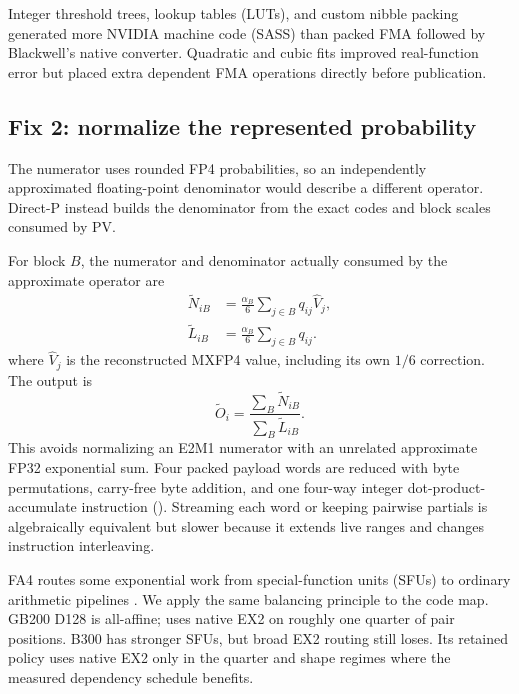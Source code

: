 Integer threshold trees, lookup tables (LUTs), and custom nibble packing
generated more NVIDIA machine code (SASS) than packed FMA followed by
Blackwell's native converter. Quadratic and cubic
fits improved real-function error but placed extra dependent FMA operations
directly before publication.

\subsection{Fix 2: normalize the represented probability}

The numerator uses rounded FP4 probabilities, so an independently approximated
floating-point denominator would describe a different operator.  Direct-P
instead builds the denominator from the exact codes and block scales consumed
by PV.

For block $B$, the numerator and denominator actually consumed by the
approximate operator are
\begin{align}
  \widetilde N_{iB} &= \frac{\alpha_B}{6}
    \sum_{j\in B}q_{ij}\widehat V_j, \\
  \widetilde L_{iB} &= \frac{\alpha_B}{6}
    \sum_{j\in B}q_{ij}.
  \label{eq:represented-contributions}
\end{align}
where $\widehat V_j$ is the reconstructed MXFP4 value, including its own
$1/6$ correction.  The output is
\begin{equation}
  \widetilde O_i=
  \frac{\sum_B\widetilde N_{iB}}{\sum_B\widetilde L_{iB}}.
  \label{eq:represented-output}
\end{equation}
This avoids normalizing an E2M1 numerator with an unrelated approximate FP32
exponential sum. Four packed payload words are reduced with byte permutations,
carry-free byte addition, and one four-way integer dot-product-accumulate
instruction (). Streaming each word or keeping
pairwise partials is algebraically equivalent but slower because it extends
live ranges and changes instruction interleaving.

FA4 routes some exponential work from special-function units (SFUs) to
ordinary arithmetic pipelines
\cite{zadouri2026flashattention4}. We apply the same balancing principle to
the code map. GB200 D128  is all-affine;  uses
native EX2 on roughly one quarter of pair positions. B300 has stronger SFUs,
but broad EX2 routing still loses. Its retained policy uses native EX2 only in
the quarter and shape regimes where the measured dependency schedule benefits.

